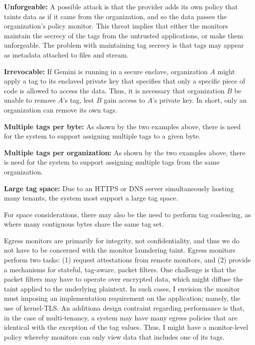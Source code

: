 %
\begin{widelist}
\item \textbf{Unforgeable:}
    A possible attack is that the provider adds its own policy that taints data as
    if it came from the organization, and so the data passes the organization's
    policy monitor.
    This threat implies that either the monitors maintain the secrecy of the tags
    from the untrusted applications, or make them unforgeable.
    The problem with maintaining tag secrecy is that tags may appear as metadata
    attached to files and stream.

\item \textbf{Irrevocable:}
    If Gemini is running in a secure enclave, organization $A$ might apply
    a tag to its enclaved private key that specifies that only a specific
    piece of code is allowed to access the data.
    Thus, it is necessary that organization $B$ be unable to remove $A$'s tag,
    lest $B$ gain access to $A$'s private key.
    In short, only an organization can remove its own tags.

\item \textbf{Multiple tags per byte:}
    As shown by the two examples above, there is need for the system to support
    assigning multiple tags to a given byte.

\item \textbf{Multiple tags per organization:}
    As shown by the two examples above, there is need for the system to support
    assigning multiple tags from the same organization.

\item \textbf{Large tag space:}
    Due to an HTTPS or DNS server simultaneously hosting many tenants, the
    system most support a large tag space.
\end{widelist}

For space considerations, there may also be the need to perform tag coalescing, as where
many contiguous bytes share the same tag set.


%
Egress monitors are primarily for integrity, not confidentiality, and thus
we do not have to be concerned with the monitor laundering taint.
%
Egress monitors perform two tasks: (1) request attestations from remote
monitors, and (2) provide a mechanisms for stateful, tag-aware, packet filters.
%
One challenge is that the packet filters may have to operate over encrypted
data, which might diffuse the taint applied to the underlying plaintext.
%
In such cases, I  envision the monitor must imposing
an implementation requirement on the application; namely, the use of
kernel-TLS\@.
%
An additiona design contraint regarding performance is that, in the case of
multi-tenancy, a system may have many egress policies that are identical with
the exception of the tag values.  Thus, I might have a monitor-level policy
whereby monitors can only view data that includes one of its tags.




